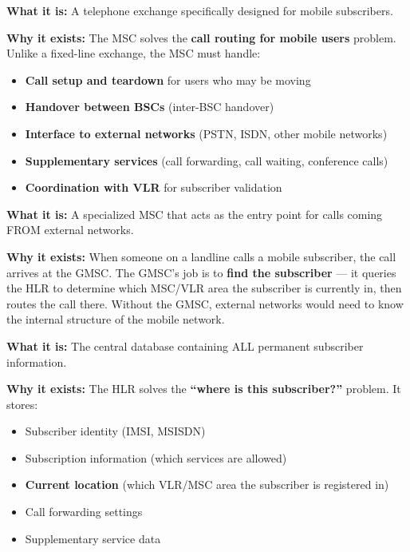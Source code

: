 \textbf{What it is:} A telephone exchange specifically designed for mobile subscribers.

\textbf{Why it exists:} The MSC solves the \textbf{call routing for mobile users} problem. Unlike a fixed-line exchange, the MSC must handle:

\begin{itemize}
\tightlist
\item
  \textbf{Call setup and teardown} for users who may be moving
\item
  \textbf{Handover between BSCs} (inter-BSC handover)
\item
  \textbf{Interface to external networks} (PSTN, ISDN, other mobile networks)
\item
  \textbf{Supplementary services} (call forwarding, call waiting, conference calls)
\item
  \textbf{Coordination with VLR} for subscriber validation
\end{itemize}


\textbf{What it is:} A specialized MSC that acts as the entry point for calls coming FROM external networks.

\textbf{Why it exists:} When someone on a landline calls a mobile subscriber, the call arrives at the GMSC. The GMSC’s job is to \textbf{find the subscriber} — it queries the HLR to determine which MSC/\allowbreak{}VLR area the subscriber is currently in, then routes the call there. Without the GMSC, external networks would need to know the internal structure of the mobile network.


\textbf{What it is:} The central database containing ALL permanent subscriber information.

\textbf{Why it exists:} The HLR solves the \textbf{``where is this subscriber?''} problem. It stores:

\begin{itemize}
\tightlist
\item
  Subscriber identity (IMSI, MSISDN)
\item
  Subscription information (which services are allowed)
\item
  \textbf{Current location} (which VLR/\allowbreak{}MSC area the subscriber is registered in)
\item
  Call forwarding settings
\item
  Supplementary service data
\end{itemize}

